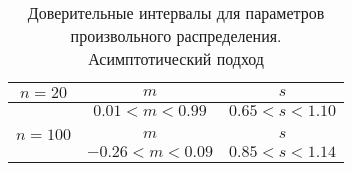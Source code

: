 \begin{table}[H]
    \centering
    \begin{tabular}{c|c|c}
        $n=20$ & $m$ & $s$ \\
        \hline
         & $0.01 < m < 0.99$ & $0.65 < s < 1.10$ \\
        \multicolumn{3}{c}{} \\
        $n=100$ & $m$ & $s$ \\
        \hline
         & $-0.26 < m < 0.09$ & $0.85 < s < 1.14$ \\
    \end{tabular}
    \caption{Доверительные интервалы для параметров произвольного распределения. Асимптотический подход}
    \label{tab:interv_asimpt}
\end{table}